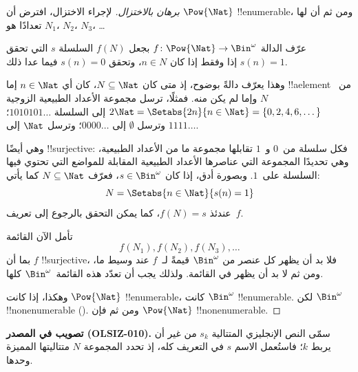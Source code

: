 \documentclass[../../../include/open-logic-section]{subfiles}
\begin{document}
\begin{proof}[برهان {} بالاختزال]
لإجراء الاختزال، افترض أن $\Pow{\Nat}$ !!{enumerable}، ومن ثم أن لها
تعدادًا هو $N_{1}$، $N_{2}$، $N_{3}$، \dots

عرّف الدالة $f \colon \Pow{\Nat} \to \Bin^\omega$ بجعل
$f(N)$ السلسلة $s$ التي تحقق $s(n) = 1$ إذا وفقط إذا كان $n \in N$،
وتحقق $s(n) = 0$ فيما عدا ذلك.

وهذا يعرّف دالةً بوضوح، إذ متى كان $N \subseteq \Nat$، كان
أي $n \in \Nat$ إما !!a{element} من~$N$ وإما لم يكن منه. فمثلًا،
ترسل مجموعة الأعداد الطبيعية الزوجية $2\Nat = \Setabs{2n}{n \in \Nat} = \{0,2, 4, 6,
\dots\}$ إلى السلسلة $1010101\dots$؛ وترسل $\emptyset$ إلى
$0000\dots$؛ وترسل $\Nat$ إلى $1111\dots$.

وهي أيضًا !!{surjective}: فكل سلسلة من~$0$ و~$1$ تقابلها مجموعة ما
من الأعداد الطبيعية، وهي تحديدًا المجموعة التي عناصرها الأعداد الطبيعية
المقابلة للمواضع التي تحتوي فيها السلسلة على~$1$. وبصورة أدق، إذا كان $s \in \Bin^\omega$، فعرّف $N
\subseteq \Nat$ كما يأتي:
\[
N = \Setabs{n \in \Nat}{s(n) = 1}
\]
عندئذ $f(N) = s$، كما يمكن التحقق بالرجوع إلى تعريف~$f$.

تأمل الآن القائمة
\[
f(N_1), f(N_2), f(N_3), \dots
\]
بما أن $f$ !!{surjective}، فلا بد أن يظهر كل عنصر من $\Bin^\omega$
قيمةً لـ~$f$ عند وسيط ما، ومن ثم لا بد أن يظهر في القائمة. ولذلك
يجب أن تعدّد هذه القائمة~$\Bin^\omega$ كلها.

وهكذا، إذا كانت $\Pow{\Nat}$ !!{enumerable}، كانت $\Bin^\omega$
!!{enumerable}. لكن $\Bin^\omega$ !!{nonenumerable}
(). ومن ثم فإن $\Pow{\Nat}$
!!{nonenumerable}.
\end{proof}

\begin{editorial}
\textbf{تصويب في المصدر (OLSIZ-010).}
سمّى النص الإنجليزي المتتالية $s_k$ من غير أن يربط $k$؛ فاستُعمل الاسم
$s$ في التعريف كله، إذ تحدد المجموعة $N$ متتاليتها المميزة وحدها.
\end{editorial}

\end{document}
